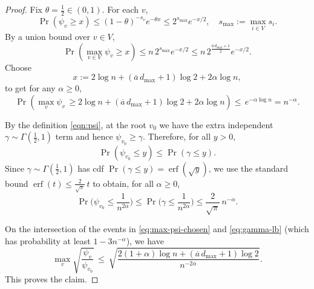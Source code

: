 \documentclass[a4paper, 11pt]{article}
\begin{document}
\begin{proof}
Fix $\theta=\frac12\in(0,1)$. For each $v$,
\[
\Pr(\psi_v\ge x)\le (1-\theta)^{-s_v}e^{-\theta x} \le 2^{s_{\max}} e^{-x/2},
\quad s_{\max}:=\max_{i\in V}s_i.
\]
By a union bound over $v\in V$,
\begin{equation}\label{eq:max-psi-upper}
\Pr\left(\max_{v\in V}\psi_v\ge x\right)\le n\,2^{s_{\max}}e^{-x/2}\le n\,2^{\frac{\overline{a}\,d_{\max}+1}{2}}e^{-x/2}.
\end{equation}
Choose
\[
x:=2\log n+(\overline{a}\,d_{\max}+1)\log 2+2\alpha \log n,
\]
to get for any $\alpha\geq 0$,
\begin{equation}\label{eq:max-psi-chosen}
\Pr\left(\max_{v}\psi_v\,\ge 2\log n+(\overline{a}\,d_{\max}+1)\log 2+2\alpha \log n\right) \le\,e^{-\alpha \log n} = n^{-\alpha}.
\end{equation}


By the definition \eqref{eqn:psi}, at the root $v_0$ we have the extra independent $\gamma\sim\Gamma(\tfrac12,1)$ term and hence $\psi_{v_0} \ge \gamma$. Therefore, for all $y>0$,
\[
\Pr(\psi_{v_0}\le y)\le \Pr(\gamma\le y).
\]
Since $\gamma\sim\Gamma(\tfrac12,1)$ has cdf $\Pr(\gamma\le y)=\operatorname{erf}(\sqrt{y})$, we use the standard bound $\operatorname{erf}(t) \le \frac{2}{\sqrt{\pi}}\,t$ to obtain, for all $\alpha\ge 0$,
\begin{equation}\label{eq:gamma-lb}
\Pr\Big(\psi_{v_0}\le \frac{1}{n^{2\alpha}}\Big)\le \Pr\Big(\gamma\le \frac{1}{n^{2\alpha}}\Big)\le \frac{2}{\sqrt{\pi}}\,n^{-\alpha}.
\end{equation}


On the intersection of the events in \eqref{eq:max-psi-chosen} and \eqref{eq:gamma-lb} (which has probability at least $1-3n^{-\alpha}$), we have
\[
\max_{v}\sqrt{\frac{\psi_v}{\psi_{v_0}}}
\,\le\
\sqrt{\frac{2(1+\alpha)\log n+(\overline{a}\,d_{\max}+1)\log 2}{n^{-2\alpha}}}.
\]
This proves the claim.
\end{proof}
\end{document}
